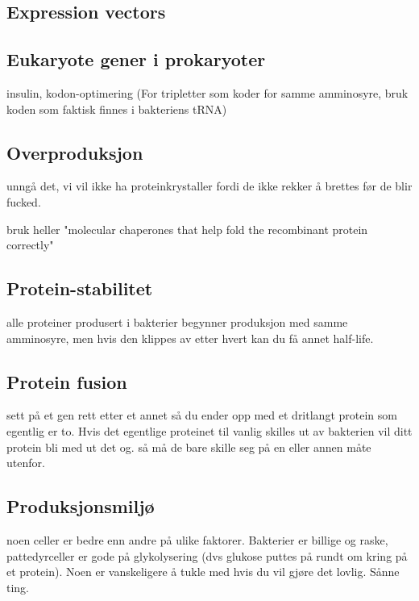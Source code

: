 \subsection{Expression vectors}

\subsection{Eukaryote gener i prokaryoter}
    insulin, kodon-optimering (For tripletter som koder for samme amminosyre, bruk koden som faktisk finnes i bakteriens tRNA)


\subsection{Overproduksjon}
    unngå det, vi vil ikke ha proteinkrystaller fordi de ikke rekker å brettes før de blir fucked.

    bruk heller "molecular chaperones that help fold the recombinant protein correctly"


\subsection{Protein-stabilitet}
    alle proteiner produsert i bakterier begynner produksjon med samme amminosyre, men hvis den klippes av etter hvert kan du få annet half-life.

\subsection{Protein fusion}
    sett på et gen rett etter et annet så du ender opp med et dritlangt protein som egentlig er to. Hvis det egentlige proteinet 
    til vanlig skilles ut av bakterien vil ditt protein bli med ut det og. så må de bare skille seg på en eller annen måte utenfor. 

\subsection{Produksjonsmiljø}
    noen celler er bedre enn andre på ulike faktorer. Bakterier er billige og raske, pattedyrceller er gode på glykolysering 
    (dvs glukose puttes på rundt om kring på et protein).
    Noen er vanskeligere å tukle med hvis du vil gjøre det lovlig. Sånne ting.

